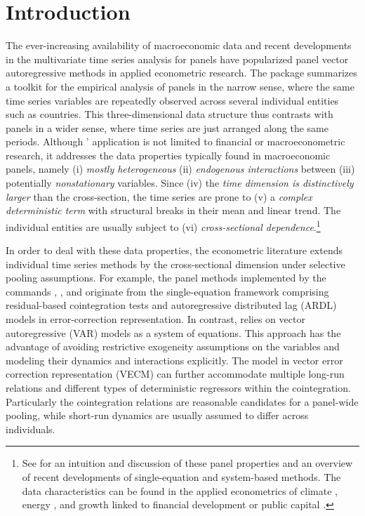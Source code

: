 
\section{Introduction} \label{sec:Intro}
The ever-increasing availability of macroeconomic data and recent developments in the multivariate time series analysis for panels have popularized panel vector autoregressive methods in applied econometric research. The  package summarizes a toolkit for the empirical analysis of panels in the narrow sense, where the same time series variables are repeatedly observed across several individual entities such as countries. This three-dimensional data structure thus contrasts with panels in a wider sense, where time series are just arranged along the same periods. Although ' application is not limited to financial or macroeconometric research, it addresses the data properties typically found in macroeconomic panels, namely (i) \textit{mostly heterogeneous} (ii) \textit{endogenous interactions} between (iii) potentially \textit{nonstationary} variables. Since (iv) the \textit{time dimension is distinctively larger} than the cross-section, the time series are prone to (v) a \textit{complex deterministic term} with structural breaks in their mean and linear trend. The individual entities are usually subject to (vi) \textit{cross-sectional dependence}.\footnote{See \citet{Pedroni2019} for an intuition and discussion of these panel properties and an overview of recent developments of single-equation and system-based methods. The data characteristics can be found in the applied econometrics of climate \citep{Pretis2020}, energy \citep{SmythNarayan2015}, and growth linked to financial development \citep{ChristopoulosTsionas2004} or public capital \citep{EmptingHerwartz2021b}.}

In order to deal with these data properties, the econometric literature extends individual time series methods by the cross-sectional dimension under selective pooling assumptions. For example, the panel methods implemented by the  commands  \citep{StataCorp2025},  \citep{PersynWesterlund2008}, and  \citep{BlackburneFrank2007} originate from the single-equation framework comprising residual-based cointegration tests and autoregressive distributed lag (ARDL) models in error-correction representation. 
In contrast,  relies on vector autoregressive (VAR) models as a system of equations. This approach has the advantage of avoiding restrictive exogeneity assumptions on the variables and modeling their dynamics and interactions explicitly.
The model in vector error correction representation (VECM) can further accommodate multiple long-run relations and different types of deterministic regressors within the cointegration. Particularly the cointegration relations are reasonable candidates for a panel-wide pooling, while short-run dynamics are usually assumed to differ across individuals. 

